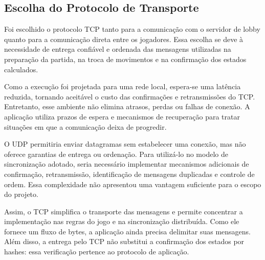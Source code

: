 \documentclass[11pt,a4paper]{article}
\begin{document}
\subsection{Escolha do Protocolo de Transporte}
Foi escolhido o protocolo TCP tanto para a comunicação com o servidor de lobby quanto para a comunicação direta entre os jogadores. Essa escolha se deve à necessidade de entrega confiável e ordenada das mensagens utilizadas na preparação da partida, na troca de movimentos e na confirmação dos estados calculados.

Como a execução foi projetada para uma rede local, espera-se uma latência reduzida, tornando aceitável o custo das confirmações e retransmissões do TCP. Entretanto, esse ambiente não elimina atrasos, perdas ou falhas de conexão. A aplicação utiliza prazos de espera e mecanismos de recuperação para tratar situações em que a comunicação deixa de progredir.

O UDP permitiria enviar datagramas sem estabelecer uma conexão, mas não oferece garantias de entrega ou ordenação. Para utilizá-lo no modelo de sincronização adotado, seria necessário implementar mecanismos adicionais de confirmação, retransmissão, identificação de mensagens duplicadas e controle de ordem. Essa complexidade não apresentou uma vantagem suficiente para o escopo do projeto.

Assim, o TCP simplifica o transporte das mensagens e permite concentrar a implementação nas regras do jogo e na sincronização distribuída. Como ele fornece um fluxo de bytes, a aplicação ainda precisa delimitar suas mensagens. Além disso, a entrega pelo TCP não substitui a confirmação dos estados por hashes: essa verificação pertence ao protocolo de aplicação.


\end{document}
